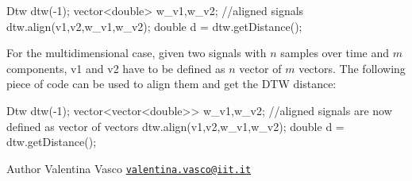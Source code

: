 \begin{DoxyCode}
Dtw dtw(-1);
vector<double> w\_v1,w\_v2; \textcolor{comment}{//aligned signals}
dtw.align(v1,v2,w\_v1,w\_v2);
\textcolor{keywordtype}{double} d = dtw.getDistance();
\end{DoxyCode}


For the multidimensional case, given two signals with $n$ samples over time and $m$ components, v1 and v2 have to be defined as $n$ vector of $m$ vectors. The following piece of code can be used to align them and get the D\+TW distance\+:


\begin{DoxyCode}
Dtw dtw(-1);
vector<vector<double>> w\_v1,w\_v2; \textcolor{comment}{//aligned signals are now defined as vector of vectors}
dtw.align(v1,v2,w\_v1,w\_v2);
\textcolor{keywordtype}{double} d = dtw.getDistance();
\end{DoxyCode}


\begin{DoxyAuthor}{Author}
Valentina Vasco \href{mailto:valentina.vasco@iit.it}{\tt valentina.\+vasco@iit.\+it} 
\end{DoxyAuthor}
